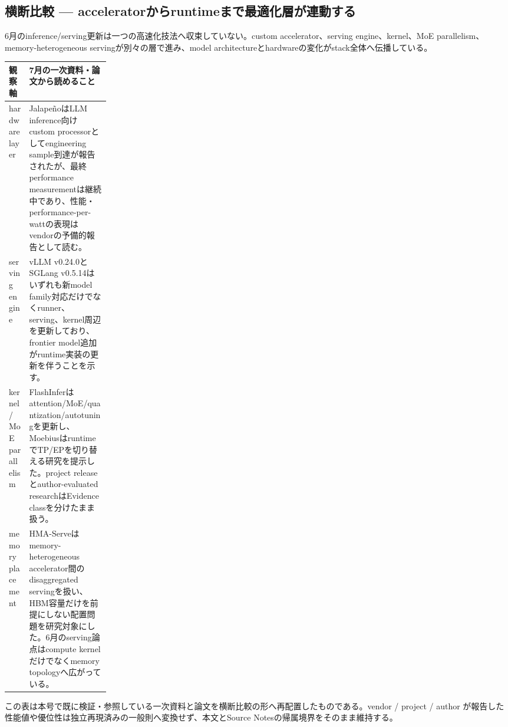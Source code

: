 \subsection*{横断比較 — acceleratorからruntimeまで最適化層が連動する}
6月のinference/serving更新は一つの高速化技法へ収束していない。custom accelerator、serving engine、kernel、MoE parallelism、memory-heterogeneous servingが別々の層で進み、model architectureとhardwareの変化がstack全体へ伝播している。
\medskip
\begin{center}
\small
\renewcommand{\arraystretch}{1.16}
\begin{tabularx}{\linewidth}{@{}p{0.20\linewidth}X@{}}
\toprule
観察軸 & 7月の一次資料・論文から読めること \\
\midrule
hardware layer & JalapeñoはLLM inference向けcustom processorとしてengineering sample到達が報告されたが、最終performance measurementは継続中であり、性能・performance-per-wattの表現はvendorの予備的報告として読む。 \cite{src-855db08b75f6} \\
serving engine & vLLM v0.24.0とSGLang v0.5.14はいずれも新model family対応だけでなくrunner、serving、kernel周辺を更新しており、frontier model追加がruntime実装の更新を伴うことを示す。 \cite{src-6cc910fb0183,src-538cecdad845} \\
kernel / MoE parallelism & FlashInferはattention/MoE/quantization/autotuningを更新し、MoebiusはruntimeでTP/EPを切り替える研究を提示した。project releaseとauthor-evaluated researchはEvidence classを分けたまま扱う。 \cite{src-272a6dac5bcc,src-43606e2afafd} \\
memory placement & HMA-Serveはmemory-heterogeneous accelerator間のdisaggregated servingを扱い、HBM容量だけを前提にしない配置問題を研究対象にした。6月のserving論点はcompute kernelだけでなくmemory topologyへ広がっている。 \cite{src-a66d76643eee} \\
\bottomrule
\end{tabularx}
\renewcommand{\arraystretch}{1.0}
\end{center}
\normalsize
\begin{claimboundary}[この比較の境界]
この表は本号で既に検証・参照している一次資料と論文を横断比較の形へ再配置したものである。vendor / project / author が報告した性能値や優位性は独立再現済みの一般則へ変換せず、本文とSource Notesの帰属境界をそのまま維持する。
\end{claimboundary}
